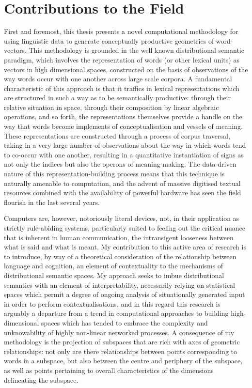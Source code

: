 \section{Contributions to the Field}
First and foremost, this thesis presents a novel computational methodology for using linguistic data to generate conceptually productive geometries of word-vectors.  This methodology is grounded in the well known distributional semantic paradigm, which involves the representation of words (or other lexical units) as vectors in high dimensional spaces, constructed on the basis of observations of the way words occur with one another across large scale corpora.  A fundamental characteristic of this approach is that it traffics in lexical representations which are structured in such a way as to be semantically productive: through their relative situation in space, through their composition by linear algebraic operations, and so forth, the representations themselves provide a handle on the way that words become implements of conceptualisation and vessels of meaning.  These representations are constructed through a process of corpus traversal, taking in a very large number of observations about the way in which words tend to co-occur with one another, resulting in a quantitative instantiation of signs as not only the indices but also the operons of meaning-making.  The data-driven nature of this representation-building process means that this technique is naturally amenable to computation, and the advent of massive digitised textual resources combined with the availability of powerful hardware has seen the field flourish in the last several years.

Computers are, however, notoriously literal devices, not, in their application as strictly rule-abiding systems, particularly suited to feeling out the critical nuance that is inherent in human communication, the intransigent looseness between what is said and what is meant.  My contribution to this active area of research is to introduce, by way of a theoretical consideration of the relationship between language and cognition, an element of contextuality to the mechanisms of distributional semantic spaces.  My approach seeks to imbue distributional semantics with an element of interpretability, necessarily relying on statistical spaces which permit a degree of ongoing analysis of situationally generated input in order to perform contextualisations, and in this regard this research is arguably a departure from a trend in computational approaches to building high-dimensional spaces which has tended to embrace the complexity and unknowability of highly non-linear networked processes.  A consequence of my methodology is the projection of subspaces that are rich with axes of geometric relationships: not only are there relationships between points corresponding to words in a subspace, but also between the centre and periphery of the subspace, as well as points pertaining to overall characteristics of the dimensions delineating the subspace.

